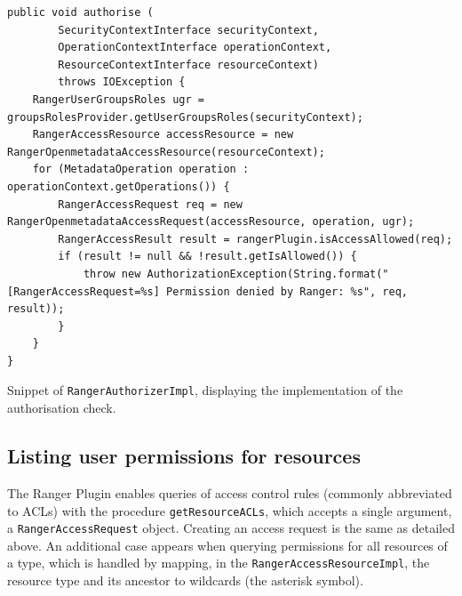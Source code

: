 \begin{listing}

\begin{verbatim}
public void authorise (
        SecurityContextInterface securityContext,
        OperationContextInterface operationContext,
        ResourceContextInterface resourceContext)
        throws IOException {
    RangerUserGroupsRoles ugr = groupsRolesProvider.getUserGroupsRoles(securityContext);
    RangerAccessResource accessResource = new RangerOpenmetadataAccessResource(resourceContext);
    for (MetadataOperation operation : operationContext.getOperations()) {
        RangerAccessRequest req = new RangerOpenmetadataAccessRequest(accessResource, operation, ugr);
        RangerAccessResult result = rangerPlugin.isAccessAllowed(req);
        if (result != null && !result.getIsAllowed()) {
            throw new AuthorizationException(String.format("[RangerAccessRequest=%s] Permission denied by Ranger: %s", req, result));
        }
    }
}
\end{verbatim}

\caption{Snippet of \texttt{RangerAuthorizerImpl}, displaying the implementation of the authorisation check.}
\label{listing:ranger_authorizer_impl_authorize}
    
\end{listing}

\subsection{Listing user permissions for resources}

The Ranger Plugin enables queries of access control rules (commonly abbreviated to ACLs) with the procedure \texttt{getResourceACLs}, which accepts a single argument, a \texttt{RangerAccessRequest} object. Creating an access request is the same as detailed above. An additional case appears when querying permissions for all resources of a type, which is handled by mapping, in the \texttt{RangerAccessResourceImpl}, the resource type and its ancestor to wildcards (the asterisk symbol).

